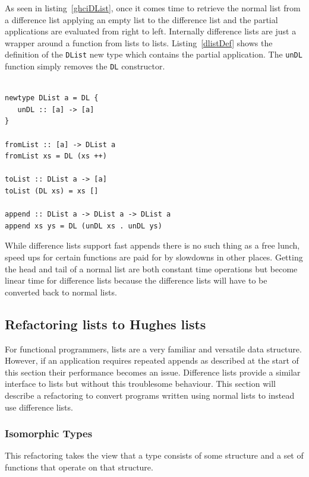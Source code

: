 As seen in listing~\ref{ghciDList}, once it comes time to retrieve the normal list from a difference list applying an empty list to the difference list and the partial applications are evaluated from right to left. Internally difference lists are just a wrapper around a function from lists to lists. Listing~\ref{dlistDef} shows the definition of the \texttt{DList} new type which contains the partial application. The \texttt{unDL} function simply removes the \texttt{DL} constructor. 

\begin{lstlisting}[caption={The definition of \texttt{DList} taken from~\citep{realWorldHaskell}}, label=dlistDef]

newtype DList a = DL {
   unDL :: [a] -> [a]
}

fromList :: [a] -> DList a
fromList xs = DL (xs ++)

toList :: DList a -> [a]
toList (DL xs) = xs []

append :: DList a -> DList a -> DList a
append xs ys = DL (unDL xs . unDL ys)
\end{lstlisting}

While difference lists support fast appends there is no such thing as a free lunch, speed ups for certain functions are paid for by slowdowns in other places. Getting the head and tail of a normal list are both constant time operations but become linear time for difference lists because the difference lists will have to be converted back to normal lists. 


\subsection{Refactoring lists to Hughes lists}

For functional programmers, lists are a very familiar and versatile data structure. However, if an application requires repeated appends as described at the start of this section their performance becomes an issue. Difference lists provide a similar interface to lists but without this troublesome behaviour. This section will describe a refactoring to convert programs written using normal lists to instead use difference lists. 

\subsubsection{Isomorphic Types} 
This refactoring takes the view that a type consists of some structure and a set of functions that operate on that structure. 

